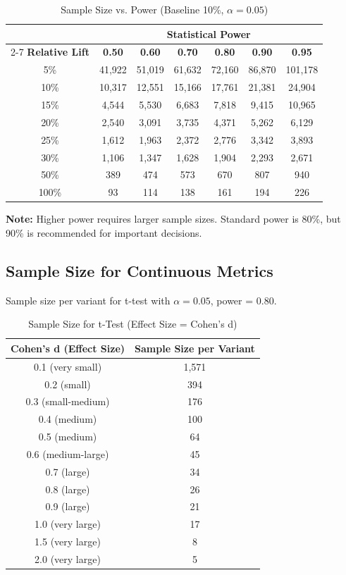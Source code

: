 \begin{table}[h]
\centering
\caption{Sample Size vs. Power (Baseline 10\%, $\alpha = 0.05$)}
\begin{tabular}{c|cccccc}
\toprule
& \multicolumn{6}{c}{\textbf{Statistical Power}} \\
\cmidrule{2-7}
\textbf{Relative Lift} & \textbf{0.50} & \textbf{0.60} & \textbf{0.70} & \textbf{0.80} & \textbf{0.90} & \textbf{0.95} \\
\midrule
5\% & 41,922 & 51,019 & 61,632 & 72,160 & 86,870 & 101,178 \\
10\% & 10,317 & 12,551 & 15,166 & 17,761 & 21,381 & 24,904 \\
15\% & 4,544 & 5,530 & 6,683 & 7,818 & 9,415 & 10,965 \\
20\% & 2,540 & 3,091 & 3,735 & 4,371 & 5,262 & 6,129 \\
25\% & 1,612 & 1,963 & 2,372 & 2,776 & 3,342 & 3,893 \\
30\% & 1,106 & 1,347 & 1,628 & 1,904 & 2,293 & 2,671 \\
50\% & 389 & 474 & 573 & 670 & 807 & 940 \\
100\% & 93 & 114 & 138 & 161 & 194 & 226 \\
\bottomrule
\end{tabular}
\end{table}

\textbf{Note:} Higher power requires larger sample sizes. Standard power is 80\%, but 90\% is recommended for important decisions.

\subsection{Sample Size for Continuous Metrics}

Sample size per variant for t-test with $\alpha = 0.05$, power = 0.80.

\begin{table}[h]
\centering
\caption{Sample Size for t-Test (Effect Size = Cohen's d)}
\begin{tabular}{cc}
\toprule
\textbf{Cohen's d (Effect Size)} & \textbf{Sample Size per Variant} \\
\midrule
0.1 (very small) & 1,571 \\
0.2 (small) & 394 \\
0.3 (small-medium) & 176 \\
0.4 (medium) & 100 \\
0.5 (medium) & 64 \\
0.6 (medium-large) & 45 \\
0.7 (large) & 34 \\
0.8 (large) & 26 \\
0.9 (large) & 21 \\
1.0 (very large) & 17 \\
1.5 (very large) & 8 \\
2.0 (very large) & 5 \\
\bottomrule
\end{tabular}
\end{table}

